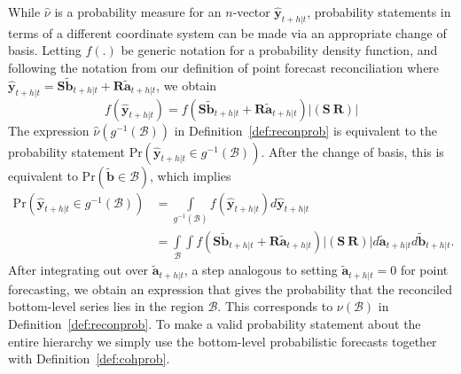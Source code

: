\documentclass[12pt]{article}
\theoremstyle{definition}
\begin{document}
While $\hat{\nu}$ is a probability measure for an $n$-vector $\hat{\bm{y}}_{t+h|t}$, probability statements in terms of a different coordinate system can be made via an appropriate change of basis. Letting $f(.)$ be generic notation for a probability density function, and following the notation from our definition of point forecast reconciliation where $\hat{\bm{y}}_{t+h|t}=\bm{S}\tilde{\bm{b}}_{t+h|t}+\bm{R}\tilde{\bm{a}}_{t+h|t}$, we obtain
\begin{equation}
f(\hat{\bm{y}}_{t+h|t})=f(\bm{S}\tilde{\bm{b}}_{t+h|t}+\bm{R}\tilde{\bm{a}}_{t+h|t})|(\bm{S}~\bm{R})|
\end{equation}
The expression $\hat{\nu}(g^{-1}(\mathcal{B}))$ in Definition~\ref{def:reconprob} is equivalent to the probability statement $\text{Pr}(\hat{\bm{y}}_{t+h|t}\in g^{-1}(\mathcal{B}))$. After the change of basis, this is equivalent to $\text{Pr}(\tilde{\bm{b}}\in \mathcal{B})$, which implies
\begin{align}
\text{Pr}(\hat{\bm{y}}_{t+h|t}\in g^{-1}(\mathcal{B}))&=\int\limits_{g^{-1}(\mathcal{B})}f(\hat{\bm{y}}_{t+h|t})d\hat{\bm{y}}_{t+h|t}\\
&=\int\limits_{\mathcal{B}}\int f(\bm{S}\tilde{\bm{b}}_{t+h|t}+\bm{R}\tilde{\bm{a}}_{t+h|t})|(\bm{S}~\bm{R})|d\tilde{\bm{a}}_{t+h|t}d\tilde{\bm{b}}_{t+h|t}.
\end{align}
After integrating out over $\tilde{\bm{a}}_{t+h|t}$, a step analogous to setting $\tilde{\bm{a}}_{t+h|t}=0$ for point forecasting, we obtain an expression that gives the probability that the reconciled bottom-level series lies in the region $\mathcal{B}$. This corresponds to $\nu(\mathcal{B})$ in Definition~\ref{def:reconprob}. To make a valid probability statement about the entire hierarchy we simply use the bottom-level probabilistic forecasts together with Definition~\ref{def:cohprob}.

\end{document}
